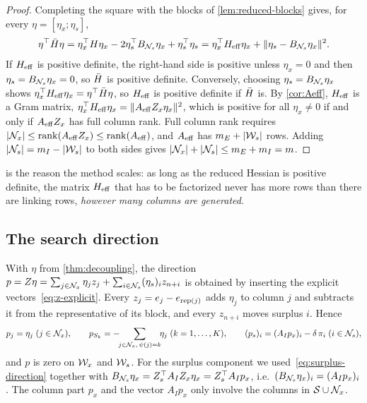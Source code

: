 \begin{proof}
Completing the square with the blocks of \cref{lem:reduced-blocks} gives, for every
$\eta = [\eta_x;\eta_s]$,
\[
\eta^\top\bar{H}\eta = \eta_x^\top H\eta_x - 2\eta_s^\top B_{\mathcal{N}_s}\eta_x + \eta_s^\top\eta_s
= \eta_x^\top H_{\mathrm{eff}}\eta_x + \lVert\eta_s - B_{\mathcal{N}_s}\eta_x\rVert^2 .
\]
If $H_{\mathrm{eff}}$ is positive definite, the right-hand side is positive unless $\eta_x = 0$ and then
$\eta_s = B_{\mathcal{N}_s}\eta_x = 0$, so $\bar{H}$ is positive definite. Conversely, choosing
$\eta_s = B_{\mathcal{N}_s}\eta_x$ shows $\eta_x^\top H_{\mathrm{eff}}\eta_x = \eta^\top\bar{H}\eta$, so $H_{\mathrm{eff}}$ is
positive definite if $\bar{H}$ is. By \cref{cor:Aeff}, $H_{\mathrm{eff}}$ is a Gram matrix,
$\eta_x^\top H_{\mathrm{eff}}\eta_x = \lVert A_{\mathrm{eff}} Z_x\eta_x\rVert^2$, which is positive for all
$\eta_x\ne0$ if and only if $A_{\mathrm{eff}} Z_x$ has full column rank. Full column rank requires
$|\mathcal{N}_x|\le\operatorname{rank}(A_{\mathrm{eff}} Z_x)\le\operatorname{rank}(A_{\mathrm{eff}})$, and $A_{\mathrm{eff}}$ has $m_E+|\mathcal{W}_s|$ rows. Adding
$|\mathcal{N}_s| = m_I - |\mathcal{W}_s|$ to both sides gives $|\mathcal{N}_x| + |\mathcal{N}_s|\le m_E + m_I = m$.
\end{proof}

 is the reason the method scales: as long as the reduced Hessian is
positive definite, the matrix $H_{\mathrm{eff}}$ that has to be factorized never has more rows than there
are linking rows, \emph{however many columns are generated}.

\subsection{The search direction}

With $\eta$ from \cref{thm:decoupling}, the direction $p = Z\eta = \sum_{j\in\mathcal{N}_x}\eta_jz_j +
\sum_{i\in\mathcal{N}_s}(\eta_s)_iz_{n+i}$ is obtained by inserting the explicit vectors~\eqref{eq:z-explicit}.
Every $z_j = e_j - e_{\operatorname{rep}(j)}$ adds $\eta_j$ to column $j$ and subtracts it from the
representative of its block, and every $z_{n+i}$ moves surplus $i$. Hence
\begin{equation} \label{eq:direction-components}
p_j = \eta_j\;(j\in\mathcal{N}_x),\qquad
p_{S_k} = -\!\!\sum_{j\in\mathcal{N}_x,\,\psi(j) = k}\!\!\eta_j\;(k = 1,\dots,K),\qquad
(p_s)_i = (A_Ip_x)_i - \delta\,\pi_i\;(i\in\mathcal{N}_s),
\end{equation}
and $p$ is zero on $\mathcal{W}_x$ and $\mathcal{W}_s$. For the surplus component we used~\eqref{eq:surplus-direction}
together with $B_{\mathcal{N}_s}\eta_x = Z_s^\top A_I Z_x\eta_x = Z_s^\top A_I p_x$, i.e.\
$(B_{\mathcal{N}_s}\eta_x)_i = (A_Ip_x)_i$. The column part $p_x$ and the vector $A_Ip_x$ only involve
the columns in $\mathcal{S}\cup\mathcal{N}_x$.

